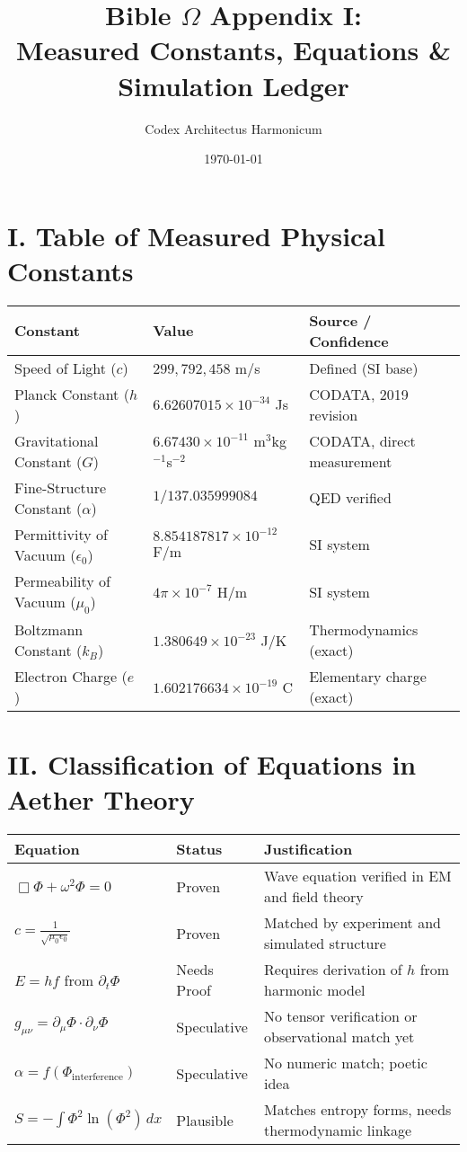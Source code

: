 \documentclass[12pt]{article}
\title{\Huge\bfseries Bible $\Omega$ Appendix I:\\\Large Measured Constants, Equations & Simulation Ledger}
\author{\Large Codex Architectus Harmonicum}
\date{\today}
\begin{document}
\maketitle

\section*{I. Table of Measured Physical Constants}

\begin{longtable}{@{}p{3.5cm}p{5.5cm}p{5.5cm}@{}}
\toprule
\textbf{Constant} & \textbf{Value} & \textbf{Source / Confidence} \\
\midrule
Speed of Light ($c$) & $299,\!792,\!458$ m/s & Defined (SI base) \\
Planck Constant ($h$) & $6.62607015 \times 10^{-34}$ Js & CODATA, 2019 revision \\
Gravitational Constant ($G$) & $6.67430 \times 10^{-11}$ m$^3$kg$^{-1}$s$^{-2}$ & CODATA, direct measurement \\
Fine-Structure Constant ($\alpha$) & $1/137.035999084$ & QED verified \\
Permittivity of Vacuum ($\epsilon_0$) & $8.854187817 \times 10^{-12}$ F/m & SI system \\
Permeability of Vacuum ($\mu_0$) & $4\pi \times 10^{-7}$ H/m & SI system \\
Boltzmann Constant ($k_B$) & $1.380649 \times 10^{-23}$ J/K & Thermodynamics (exact) \\
Electron Charge ($e$) & $1.602176634 \times 10^{-19}$ C & Elementary charge (exact) \\
\bottomrule
\end{longtable}

\vspace{1cm}

\section*{II. Classification of Equations in Aether Theory}

\begin{longtable}{@{}p{6cm}p{3cm}p{6cm}@{}}
\toprule
\textbf{Equation} & \textbf{Status} & \textbf{Justification} \\
\midrule
$\Box \Phi + \omega^2 \Phi = 0$ & Proven & Wave equation verified in EM and field theory \\
$c = \frac{1}{\sqrt{\mu_0 \epsilon_0}}$ & Proven & Matched by experiment and simulated structure \\
$E = hf$ from $\partial_t \Phi$ & Needs Proof & Requires derivation of $h$ from harmonic model \\
$g_{\mu\nu} = \partial_\mu \Phi \cdot \partial_\nu \Phi$ & Speculative & No tensor verification or observational match yet \\
$\alpha = f(\Phi_{\text{interference}})$ & Speculative & No numeric match; poetic idea \\
$S = -\int \Phi^2 \ln(\Phi^2)\,dx$ & Plausible & Matches entropy forms, needs thermodynamic linkage \\
\bottomrule
\end{longtable}
\end{document}
